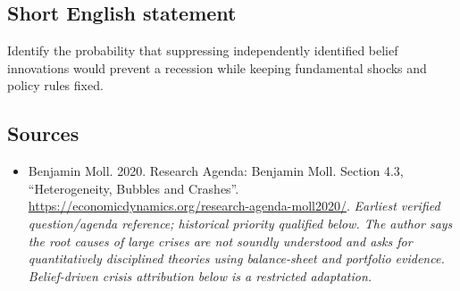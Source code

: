 \documentclass[11pt]{article}
\begin{document}
\subsection{Short English statement}
Identify the probability that suppressing independently identified belief innovations would prevent a recession while keeping fundamental shocks and policy rules fixed.

\subsection{Sources}
\begin{itemize}\raggedright
\item[\textnormal{[S1]}]\hypertarget{source:30007516:1}{} Benjamin Moll. 2020. Research Agenda: Benjamin Moll. Section 4.3, “Heterogeneity, Bubbles and Crashes”.
\url{https://economicdynamics.org/research-agenda-moll2020/}.
{\small\textit{Earliest verified question/agenda reference; historical priority qualified below. The author says the root causes of large crises are not soundly understood and asks for quantitatively disciplined theories using balance-sheet and portfolio evidence. Belief-driven crisis attribution below is a restricted adaptation.}}
\end{itemize}
\end{document}
